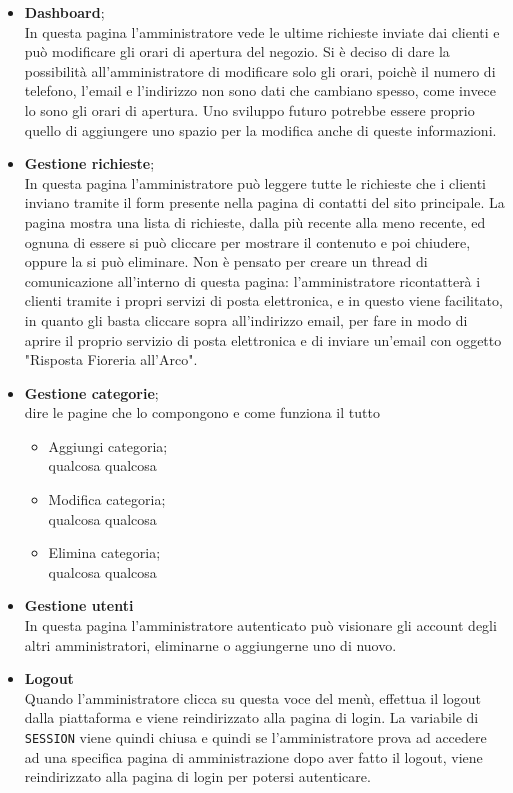 	\begin{itemize}
		\item \textbf{Dashboard};\\In questa pagina l'amministratore vede le ultime richieste inviate dai clienti e può modificare gli orari di apertura del negozio. Si è deciso di dare la possibilità all'amministratore di modificare solo gli orari, poichè il numero di telefono, l'email e l'indirizzo non sono dati che cambiano spesso, come invece lo sono gli orari di apertura. Uno sviluppo futuro potrebbe essere proprio quello di aggiungere uno spazio per la modifica anche di queste informazioni.
		\item \textbf{Gestione richieste};\\In questa pagina l'amministratore può leggere tutte le richieste che i clienti inviano tramite il form presente nella pagina di contatti del sito principale. La pagina mostra una lista di richieste, dalla più recente alla meno recente, ed ognuna di essere  si può cliccare per mostrare il contenuto e poi chiudere, oppure la si può eliminare. Non è pensato per creare un thread di comunicazione all'interno di questa pagina: l'amministratore ricontatterà i clienti tramite i propri servizi di posta elettronica, e in questo viene facilitato, in quanto gli basta cliccare sopra all'indirizzo email, per fare in modo di aprire il proprio servizio di posta elettronica e di inviare un'email con oggetto "Risposta Fioreria all'Arco".		
		\item \textbf{Gestione categorie};\\dire le pagine che lo compongono e come funziona il tutto
	 	\begin{itemize}
 			\item Aggiungi categoria;\\qualcosa qualcosa
 			\item Modifica categoria;\\qualcosa qualcosa
 			\item Elimina categoria;\\qualcosa qualcosa
	 	\end{itemize}
 	\item \textbf{Gestione utenti}\\In questa pagina l'amministratore autenticato può visionare gli account degli altri amministratori, eliminarne o aggiungerne uno di nuovo. 
 	\item \textbf{Logout}\\Quando l'amministratore clicca su questa voce del menù, effettua il logout dalla piattaforma e viene reindirizzato alla pagina di login. La variabile di \texttt{SESSION} viene quindi chiusa e quindi se l'amministratore prova ad accedere ad una specifica pagina di amministrazione dopo aver fatto il logout, viene reindirizzato alla pagina di login per potersi autenticare.\\
 	\end{itemize}
